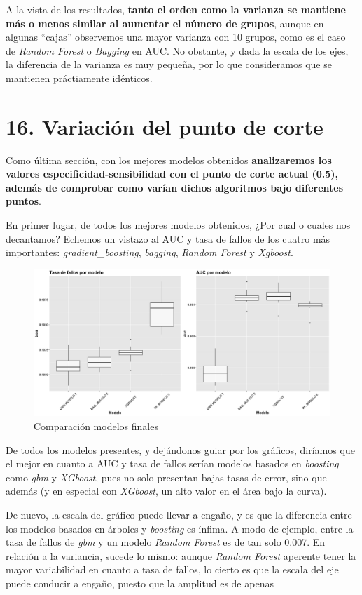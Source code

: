 \documentclass[
]{article}
\begin{document}
A la vista de los resultados, \textbf{tanto el orden como la varianza se
mantiene más o menos similar al aumentar el número de grupos}, aunque en
algunas ``cajas'' observemos una mayor varianza con 10 grupos, como es
el caso de \emph{Random Forest} o \emph{Bagging} en AUC. No obstante, y
dada la escala de los ejes, la diferencia de la varianza es muy pequeña,
por lo que consideramos que se mantienen práctiamente idénticos.

\hypertarget{variaciuxf3n-del-punto-de-corte}{%
\section{16. Variación del punto de
corte}\label{variaciuxf3n-del-punto-de-corte}}

Como última sección, con los mejores modelos obtenidos
\textbf{analizaremos los valores especificidad-sensibilidad con el punto
de corte actual (0.5), además de comprobar como varían dichos algoritmos
bajo diferentes puntos}.

En primer lugar, de todos los mejores modelos obtenidos, ¿Por cual o
cuales nos decantamos? Echemos un vistazo al AUC y tasa de fallos de los
cuatro más importantes: \emph{gradient\_boosting}, \emph{bagging},
\emph{Random Forest} y \emph{Xgboost}.

\begin{figure}[h!]

{\centering \includegraphics[width=0.99\linewidth,height=0.99\textheight,]{./charts/modelos_finales} 

}

\caption{Comparación modelos finales}\label{fig:unnamed-chunk-154}
\end{figure}

De todos los modelos presentes, y dejándonos guiar por los gráficos,
diríamos que el mejor en cuanto a AUC y tasa de fallos serían modelos
basados en \emph{boosting} como \emph{gbm} y \emph{XGboost}, pues no
solo presentan bajas tasas de error, sino que además (y en especial con
\emph{XGboost}, un alto valor en el área bajo la curva).

De nuevo, la escala del gráfico puede llevar a engaño, y es que la
diferencia entre los modelos basados en árboles y \emph{boosting} es
ínfima. A modo de ejemplo, entre la tasa de fallos de \emph{gbm} y un
modelo \emph{Random Forest} es de tan solo 0.007. En relación a la
variancia, sucede lo mismo: aunque \emph{Random Forest} aperente tener
la mayor variabilidad en cuanto a tasa de fallos, lo cierto es que la
escala del eje puede conducir a engaño, puesto que la amplitud es de
apenas
\end{document}
